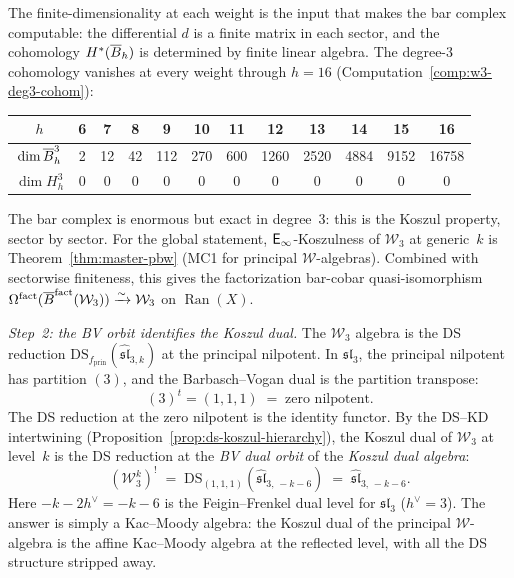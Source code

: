The finite-dimensionality at each weight is the input that makes the
bar complex computable: the differential $d$ is a finite matrix
in each sector, and the cohomology $H^*(\overline{B}_h)$ is determined by
finite linear algebra.  The degree-$3$ cohomology vanishes
at every weight through $h = 16$
(Computation~\ref{comp:w3-deg3-cohom}):
\begin{center}
\renewcommand{\arraystretch}{1.1}
\begin{tabular}{c|ccccccccccc}
$h$ & 6 & 7 & 8 & 9 & 10 & 11 & 12 & 13 & 14 & 15 & 16 \\
\hline
$\dim \overline{B}^3_h$ & 2 & 12 & 42 & 112 & 270 & 600 & 1260 & 2520 & 4884 & 9152 & 16758 \\
$\dim H^3_h$ & 0 & 0 & 0 & 0 & 0 & 0 & 0 & 0 & 0 & 0 & 0
\end{tabular}
\end{center}
The bar complex is enormous but exact in degree~$3$: this is the
Koszul property, sector by sector.  For the global statement,
$\mathsf{E}_{\infty}$-Koszulness of $\mathcal{W}_3$ at generic~$k$ is
Theorem~\ref{thm:master-pbw} (MC1 for principal $\mathcal{W}$-algebras).
Combined with sectorwise finiteness, this gives the factorization
bar-cobar quasi-isomorphism
$\Omega^{\mathrm{fact}}(\overline{B}^{\mathrm{fact}}(\mathcal{W}_3))
\xrightarrow{\sim} \mathcal{W}_3$
on $\operatorname{Ran}(X)$.

\emph{Step~2: the BV orbit identifies the Koszul dual.}
The $\mathcal{W}_3$ algebra is the DS reduction
$\mathrm{DS}_{f_{\mathrm{prin}}}(\widehat{\mathfrak{sl}}_{3,k})$
at the principal nilpotent.  In $\mathfrak{sl}_3$, the principal
nilpotent has partition $(3)$, and the Barbasch--Vogan dual is the
partition transpose:
\[
(3)^t = (1,1,1) \;=\; \text{zero nilpotent.}
\]
The DS reduction at the zero nilpotent is the identity functor.
By the DS--KD intertwining
(Proposition~\ref{prop:ds-koszul-hierarchy}), the Koszul dual
of $\mathcal{W}_3$ at level~$k$ is the DS reduction at the
\emph{BV dual orbit} of the \emph{Koszul dual algebra}:
\begin{equation}\label{eq:w3-kd-explicit}
(\mathcal{W}_3^k)^!
\;=\;
\mathrm{DS}_{(1,1,1)}(\widehat{\mathfrak{sl}}_{3,\,-k-6})
\;=\;
\widehat{\mathfrak{sl}}_{3,\,-k-6}.
\end{equation}
Here $-k - 2h^\vee = -k - 6$ is the Feigin--Frenkel dual level
for $\mathfrak{sl}_3$ ($h^\vee = 3$).  The answer is
simply a Kac--Moody algebra: the Koszul dual of the principal
$\mathcal{W}$-algebra is the affine Kac--Moody algebra at the
reflected level, with all the DS structure stripped away.

